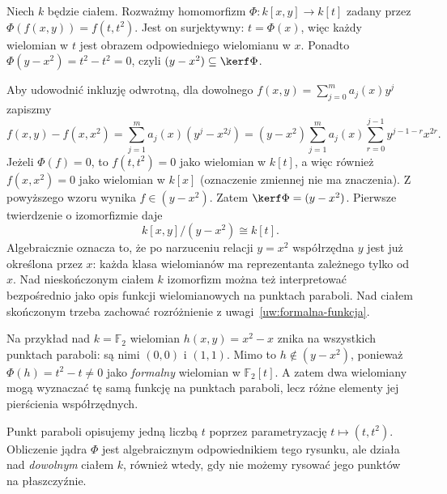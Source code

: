 \begin{przyklad}
\label{pr:parabola}
Niech $k$ będzie ciałem. Rozważmy homomorfizm
$\Phi\colon k[x,y]\to k[t]$ zadany przez
$\Phi(f(x,y))=f(t,t^2)$.
Jest on surjektywny: $t=\Phi(x)$, więc każdy wielomian w $t$
jest obrazem odpowiedniego wielomianu w $x$.
Ponadto $\Phi(y-x^2)=t^2-t^2=0$, czyli
$(y-x^2)\subseteq\kerf\Phi$.

Aby udowodnić inkluzję odwrotną, dla dowolnego
$f(x,y)=\sum_{j=0}^m a_j(x)y^j$ zapiszmy
\[
 f(x,y)-f(x,x^2)
 =\sum_{j=1}^m a_j(x)(y^j-x^{2j})
 =(y-x^2)\sum_{j=1}^m a_j(x)
   \sum_{r=0}^{j-1}y^{j-1-r}x^{2r}.
\]
Jeżeli $\Phi(f)=0$, to $f(t,t^2)=0$ jako wielomian w $k[t]$,
a więc również $f(x,x^2)=0$ jako wielomian w $k[x]$
(oznaczenie zmiennej nie ma znaczenia). Z powyższego wzoru
wynika $f\in(y-x^2)$. Zatem $\kerf\Phi=(y-x^2)$.
Pierwsze twierdzenie o izomorfizmie daje
\[
 k[x,y]/(y-x^2)\cong k[t].
\]
Algebraicznie oznacza to, że po narzuceniu relacji $y=x^2$
współrzędna $y$ jest już określona przez $x$: każda klasa wielomianów
ma reprezentanta zależnego tylko od $x$.
Nad nieskończonym ciałem $k$ izomorfizm można też interpretować
bezpośrednio jako opis funkcji wielomianowych na punktach paraboli.
Nad ciałem skończonym trzeba zachować rozróżnienie z
uwagi~\ref{uw:formalna-funkcja}.

\begin{samepage}
Na przykład nad $k=\mathbb F_2$ wielomian $h(x,y)=x^2-x$
znika na wszystkich punktach paraboli: są nimi
$(0,0)$ i $(1,1)$. Mimo to $h\notin(y-x^2)$,
ponieważ $\Phi(h)=t^2-t\ne0$ jako \emph{formalny}
wielomian w $\mathbb F_2[t]$. A zatem dwa wielomiany
mogą wyznaczać tę samą funkcję na punktach paraboli,
lecz różne elementy jej pierścienia współrzędnych.
\end{samepage}
\end{przyklad}

\begin{center}
\end{center}
Punkt paraboli opisujemy jedną liczbą $t$ poprzez parametryzację
$t\mapsto(t,t^2)$. Obliczenie jądra $\Phi$ jest algebraicznym
odpowiednikiem tego rysunku, ale działa nad \emph{dowolnym} ciałem $k$,
również wtedy, gdy nie możemy rysować jego punktów na płaszczyźnie.

